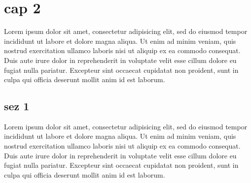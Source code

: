 \documentclass[a4paper,10pt]{report} %
\begin{document}
  \section{cap 2}
    Lorem ipsum dolor sit amet, consectetur adipisicing elit, sed do eiusmod tempor incididunt ut labore et dolore magna aliqua. Ut enim ad minim veniam, quis nostrud exercitation ullamco laboris nisi ut aliquip ex ea commodo consequat. Duis aute irure dolor in reprehenderit in voluptate velit esse cillum dolore eu fugiat nulla pariatur. Excepteur sint occaecat cupidatat non proident, sunt in culpa qui officia deserunt mollit anim id est laborum.
    \subsection{sez 1}
      Lorem ipsum dolor sit amet, consectetur adipisicing elit, sed do eiusmod tempor incididunt ut labore et dolore magna aliqua. Ut enim ad minim veniam, quis nostrud exercitation ullamco laboris nisi ut aliquip ex ea commodo consequat. Duis aute irure dolor in reprehenderit in voluptate velit esse cillum dolore eu fugiat nulla pariatur. Excepteur sint occaecat cupidatat non proident, sunt in culpa qui officia deserunt mollit anim id est laborum.
\end{document}
